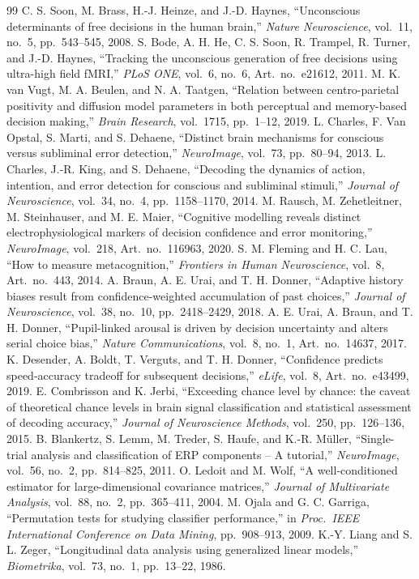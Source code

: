 \documentclass[11pt,a4paper]{article}
\begin{document}
\begin{thebibliography}{99}
 C. S. Soon, M. Brass, H.-J. Heinze, and J.-D. Haynes, ``Unconscious determinants of free decisions in the human brain,'' \textit{Nature Neuroscience}, vol.~11, no.~5, pp.~543--545, 2008.
 S. Bode, A. H. He, C. S. Soon, R. Trampel, R. Turner, and J.-D. Haynes, ``Tracking the unconscious generation of free decisions using ultra-high field fMRI,'' \textit{PLoS ONE}, vol.~6, no.~6, Art.~no.~e21612, 2011.
 M. K. van Vugt, M. A. Beulen, and N. A. Taatgen, ``Relation between centro-parietal positivity and diffusion model parameters in both perceptual and memory-based decision making,'' \textit{Brain Research}, vol.~1715, pp.~1--12, 2019.
 L. Charles, F. Van Opstal, S. Marti, and S. Dehaene, ``Distinct brain mechanisms for conscious versus subliminal error detection,'' \textit{NeuroImage}, vol.~73, pp.~80--94, 2013.
 L. Charles, J.-R. King, and S. Dehaene, ``Decoding the dynamics of action, intention, and error detection for conscious and subliminal stimuli,'' \textit{Journal of Neuroscience}, vol.~34, no.~4, pp.~1158--1170, 2014.
 M. Rausch, M. Zehetleitner, M. Steinhauser, and M. E. Maier, ``Cognitive modelling reveals distinct electrophysiological markers of decision confidence and error monitoring,'' \textit{NeuroImage}, vol.~218, Art.~no.~116963, 2020.
 S. M. Fleming and H. C. Lau, ``How to measure metacognition,'' \textit{Frontiers in Human Neuroscience}, vol.~8, Art.~no.~443, 2014.
 A. Braun, A. E. Urai, and T. H. Donner, ``Adaptive history biases result from confidence-weighted accumulation of past choices,'' \textit{Journal of Neuroscience}, vol.~38, no.~10, pp.~2418--2429, 2018.
 A. E. Urai, A. Braun, and T. H. Donner, ``Pupil-linked arousal is driven by decision uncertainty and alters serial choice bias,'' \textit{Nature Communications}, vol.~8, no.~1, Art.~no.~14637, 2017.
 K. Desender, A. Boldt, T. Verguts, and T. H. Donner, ``Confidence predicts speed-accuracy tradeoff for subsequent decisions,'' \textit{eLife}, vol.~8, Art.~no.~e43499, 2019.
 E. Combrisson and K. Jerbi, ``Exceeding chance level by chance: the caveat of theoretical chance levels in brain signal classification and statistical assessment of decoding accuracy,'' \textit{Journal of Neuroscience Methods}, vol.~250, pp.~126--136, 2015.
 B. Blankertz, S. Lemm, M. Treder, S. Haufe, and K.-R. M\"uller, ``Single-trial analysis and classification of ERP components -- A tutorial,'' \textit{NeuroImage}, vol.~56, no.~2, pp.~814--825, 2011.
 O. Ledoit and M. Wolf, ``A well-conditioned estimator for large-dimensional covariance matrices,'' \textit{Journal of Multivariate Analysis}, vol.~88, no.~2, pp.~365--411, 2004.
 M. Ojala and G. C. Garriga, ``Permutation tests for studying classifier performance,'' in \textit{Proc.\ IEEE International Conference on Data Mining}, pp.~908--913, 2009.
 K.-Y. Liang and S. L. Zeger, ``Longitudinal data analysis using generalized linear models,'' \textit{Biometrika}, vol.~73, no.~1, pp.~13--22, 1986.
\end{thebibliography}
\end{document}
